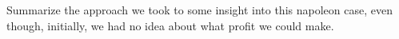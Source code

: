 \begin{exercise}
   Summarize the approach we took to some insight into this napoleon
   case, even though, initially, we had no idea about what profit we
   could make.

 \end{exercise}


